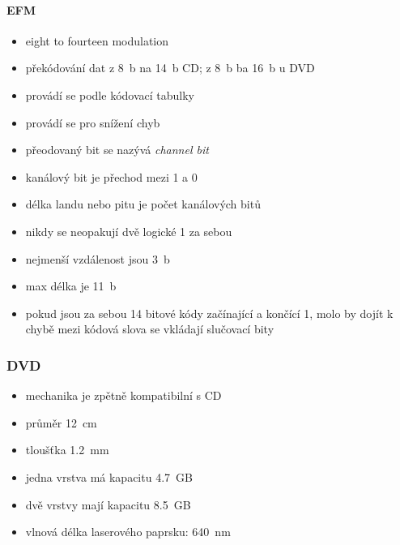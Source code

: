 \documentclass[a4paper,12pt]{article}
\providecommand{\tightlist}{%
\setlength{\itemsep}{0pt}\setlength{\parskip}{0pt}}
\begin{document}
\paragraph{EFM}

\begin{itemize}
  \tightlist
  \item eight to fourteen modulation
  \item překódování dat z 8~b na 14~b CD; z 8~b ba 16~b u DVD
  \item provádí se podle kódovací tabulky
  \item provádí se pro snížení chyb
  \item přeodovaný bit se nazývá \emph{channel bit}
  \item kanálový bit je přechod mezi 1 a 0
  \item délka landu nebo pitu je počet kanálových bitů
  \item nikdy se neopakují dvě logické 1 za sebou
  \item nejmenší vzdálenost jsou 3~b
  \item max délka je 11~b
  \item pokud jsou za sebou 14 bitové kódy začínající a končící 1, molo by dojít
  k chybě \textrightarrow{} mezi kódová slova se vkládají slučovací bity
\end{itemize}

\subsubsection{DVD}

\begin{itemize}
  \tightlist
  \item mechanika je zpětně kompatibilní s CD
  \item průměr 12~cm
  \item tloušťka 1.2~mm
  \item jedna vrstva má kapacitu 4.7~GB
  \item dvě vrstvy mají kapacitu 8.5~GB
  \item vlnová délka laserového paprsku: 640~nm
\end{itemize}
\end{document}

